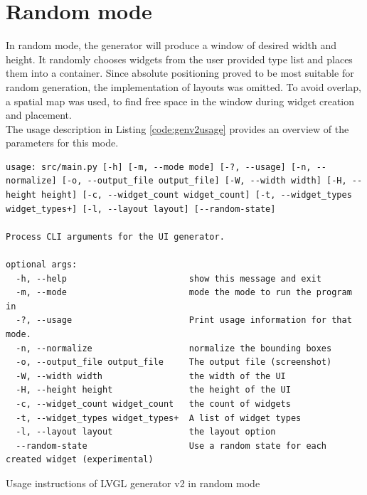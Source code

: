 \documentclass[Bachelor, BIC, english, fhCitStyle, IEEE]{BASE/twbook} %
\begin{document}
\section{Random mode}
In random mode, the generator will produce a window of desired width and height. It randomly chooses widgets from the user provided type list and places them into a container. Since absolute positioning proved to be most suitable for random generation, the implementation of layouts was omitted. To avoid overlap, a spatial map was used, to find free space in the window during widget creation and placement.\\
The usage description in Listing \ref{code:genv2usage} provides an overview of the parameters for this mode.
\begin{listing}[htbp]
    \begin{verbatim}
usage: src/main.py [-h] [-m, --mode mode] [-?, --usage] [-n, --normalize] [-o, --output_file output_file] [-W, --width width] [-H, --height height] [-c, --widget_count widget_count] [-t, --widget_types widget_types+] [-l, --layout layout] [--random-state]

Process CLI arguments for the UI generator.

optional args:
  -h, --help                        show this message and exit
  -m, --mode                        mode the mode to run the program in
  -?, --usage                       Print usage information for that mode.
  -n, --normalize                   normalize the bounding boxes
  -o, --output_file output_file     The output file (screenshot)
  -W, --width width                 the width of the UI
  -H, --height height               the height of the UI
  -c, --widget_count widget_count   the count of widgets
  -t, --widget_types widget_types+  A list of widget types
  -l, --layout layout               the layout option
  --random-state                    Use a random state for each created widget (experimental)
    \end{verbatim}
    \caption{Usage instructions of LVGL generator v2 in random mode}
    \label{code:genv2usage}
\end{listing}\\\\
\end{document}
